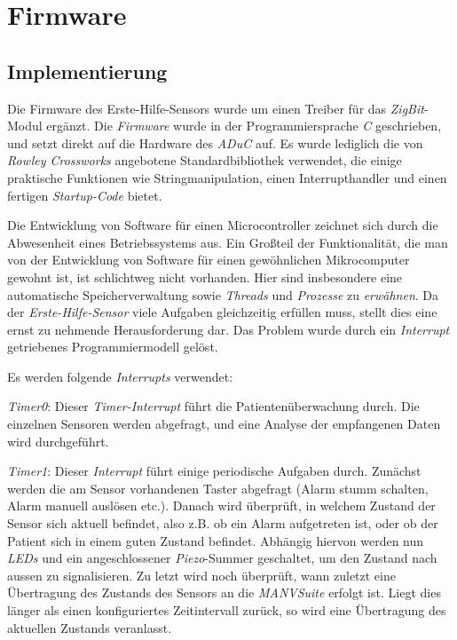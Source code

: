 \section{Firmware}
\subsection{Implementierung}
Die Firmware des Erste-Hilfe-Sensors wurde um einen Treiber für das \emph{ZigBit}-Modul ergänzt. Die \emph{Firmware}
wurde in der Programmiersprache \emph{C} geschrieben, und setzt direkt auf die Hardware des \emph{ADuC} auf. Es wurde 
lediglich die von \emph{Rowley Crossworks} angebotene Standardbibliothek verwendet, die einige praktische Funktionen wie
Stringmanipulation, einen Interrupthandler und einen fertigen \emph{Startup-Code} bietet.

Die Entwicklung von Software für einen Microcontroller zeichnet sich durch die Abwesenheit eines Betriebssystems 
aus. Ein Großteil der Funktionalität, die man von der Entwicklung von Software für einen gewöhnlichen Mikrocomputer 
gewohnt ist, ist schlichtweg nicht vorhanden. Hier sind insbesondere eine automatische Speicherverwaltung sowie
\emph{Threads} und \emph{Prozesse} zu \emph{erwähnen}. Da der \emph{Erste-Hilfe-Sensor} viele Aufgaben gleichzeitig 
erfüllen muss, stellt dies eine ernst zu nehmende Herausforderung dar. Das Problem wurde durch ein \emph{Interrupt}
getriebenes Programmiermodell gelöst.

Es werden folgende \emph{Interrupts} verwendet:

\emph{Timer0}: Dieser \emph{Timer-Interrupt} führt die Patientenüberwachung durch. Die einzelnen Sensoren werden abgefragt,
und eine Analyse der empfangenen Daten wird durchgeführt.

\emph{Timer1}: Dieser \emph{Interrupt} führt einige periodische Aufgaben durch. Zunächst werden die am Sensor vorhandenen
Taster abgefragt (Alarm stumm schalten, Alarm manuell auslösen etc.). Danach wird überprüft, in welchem Zustand
der Sensor sich aktuell befindet, also z.B. ob ein Alarm aufgetreten ist, oder ob der Patient sich in einem
guten Zustand befindet. Abhängig hiervon werden nun \emph{LEDs} und ein angeschlossener \emph{Piezo}-Summer geschaltet,
um den Zustand nach aussen zu signalisieren. Zu letzt wird noch überprüft, wann zuletzt eine Übertragung
des Zustands des Sensors an die \emph{MANVSuite} erfolgt ist. Liegt dies länger als einen konfiguriertes Zeitintervall
zurück, so wird eine Übertragung des aktuellen Zustands veranlasst.

